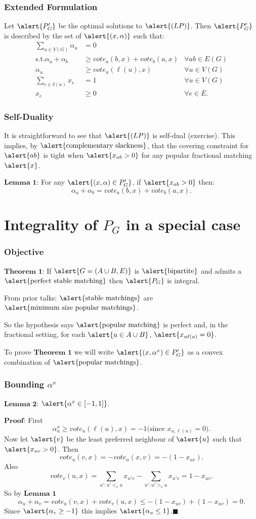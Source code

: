 \documentclass[10pt]{beamer}
\begin{document}
\begin{frame}
\frametitle{Extended Formulation}
Let $\alert{P'_G}$ be the optimal solutions to $\alert{(LP)}$. Then $\alert{P'_G}$ is described by the set of $\alert{(x,\alpha)}$ such that:
\begin{align*}
\sum_{u \in V(G)} \alpha_u &= 0 \\
\text{s.t.} \alpha_a + \alpha_b &\geq vote_a(b,x) + vote_b(a,x) &\forall ab \in E(G) \\
\alpha_u &\geq vote_u(\ell(u),x) &\forall u \in V(G) \\
\sum_{e \in \delta(u)} x_e &=1 &\forall u \in V(G) \\
x_e &\geq 0 &\forall e \in E.
\end{align*}
\end{frame}

\begin{frame}
\frametitle{Self-Duality}
It is straightforward to see that $\alert{(LP)}$ is self-dual (exercise). This implies, by $\text{\alert{complementary slackness}}$, that the covering constraint for $\alert{ab}$ is tight when $\alert{x_{ab} > 0}$ for any popular fractional matching $\alert{x}$.

$\textbf{Lemma 1}$: For any $\alert{(x,\alpha) \in P'_G}$, if $\alert{x_{ab} > 0}$ then:
$$\alpha_a + \alpha_b = vote_a(b,x) + vote_b(a,x).$$ 
\end{frame}
\section{Integrality of $P_G$ in a special case}
\begin{frame}
\frametitle{Objective}
$\textbf{Theorem 1:}$ If $\alert{G =(A\cup B, E)}$ is $\text{\alert{bipartite}}$ and admits a $\text{\alert{perfect stable matching}}$ then $\alert{P_G}$ is integral.

From prior talks: $\text{\alert{stable matchings}}$ are $\text{\alert{minimum size popular matchings}}$.

So the hypothesis says $\text{\alert{popular matching}}$ is perfect and, in the fractional setting, for each $\alert{u\in A \cup B}$, $\alert{x_{u\ell(u)} = 0}$.

To prove $\textbf{Theorem 1}$ we will write $\alert{(x,\alpha^x) \in P_G'}$ as a convex combination of $\text{\alert{popular matchings}}$.
\end{frame}

\begin{frame}
\frametitle{Bounding $\alpha^x$}
$\textbf{Lemma 2:}$ $\alert{\alpha^x \in [-1,1]}$.

$\textbf{Proof:}$ First
$$\alpha^x_u \geq vote_u(\ell(u), x) = -1 \text{(since }x_{u,\ell(u)} = 0\text{).}$$
Now let $\alert{v}$ be the least preferred neighbour of $\alert{u}$ such that $\alert{x_{uv} >0}$. Then
$$vote_u(v,x) = -vote_u(x,v) = -(1-x_{uv}).$$
Also
$$vote_v(u,x) = \sum_{u':u' <_v u} x_{u'v} - \sum_{u':u' >_v u} x_{u'v} = 1-x_{uv}.$$
So by $\textbf{Lemma 1}$
$$\alpha_u + \alpha_v = vote_u(v,x) + vote_v(u,x) \leq -(1-x_{uv}) + (1-x_{uv}) = 0.$$
Since $\alert{\alpha_v \geq -1}$ this implies $\alert{\alpha_u \leq 1}$.$\blacksquare$
\end{frame}
\end{document}
